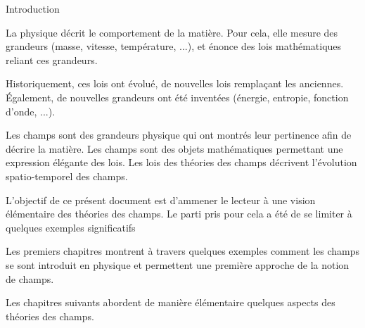 \begin{center}
\Large
Introduction
\normalsize
\end{center}
\vspace{3cm}

La physique décrit le comportement de la matière. Pour cela, elle mesure des grandeurs (masse, vitesse, température, ...), et énonce des lois mathématiques reliant ces grandeurs.

Historiquement, ces lois ont évolué, de nouvelles lois remplaçant les anciennes. Également, de nouvelles grandeurs ont été inventées (énergie, entropie, fonction d'onde, ...).

Les champs sont des grandeurs physique qui ont montrés leur pertinence afin de décrire la matière. Les champs sont des objets mathématiques permettant une expression élégante des lois. Les lois des théories des champs décrivent l'évolution spatio-temporel des champs.

\vspace{3cm}

L'objectif de ce présent document est d'ammener le lecteur à une vision élémentaire des théories des champs. Le parti pris pour cela a été de se limiter à quelques exemples significatifs

Les premiers chapitres montrent à travers quelques exemples comment les champs se sont introduit en physique et permettent une première approche de la notion de champs.

Les chapitres suivants abordent de manière élémentaire quelques aspects des théories des champs.


